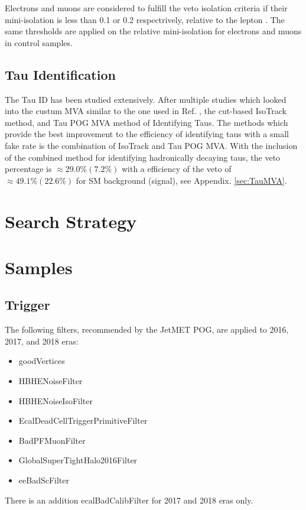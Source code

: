  Electrons and muons are considered to fulfill the veto isolation criteria if their mini-isolation is less than 0.1 or 0.2 respectrively, relative to the lepton \pt. The same thresholds are applied on the relative mini-isolation for electrons and muons in control samples. 
 
\subsection{Tau Identification}\label{TauID}
The Tau ID has been studied extensively. After multiple studies which looked into the custum MVA \cite{roe_boosted_2004, hoecker_tmva_2007} similar to the one used in Ref. \cite{noauthor_search_nodate}, the cut-based IsoTrack method, and Tau POG MVA method of Identifying Taus. The methods which provide the best improvement to the efficiency of identifying taus with a small fake rate is the combination of IsoTrack and Tau POG MVA. With the inclusion of the combined method for identifying hadronically decaying taus, the veto percentage is $\approx29.0\%(7.2\%)$ with a efficiency of the veto of $\approx49.1\%(22.6\%)$ for SM background (signal), see Appendix. \ref{sec:TauMVA}. 

\section{Search Strategy}\label{BaselineSearch}

\section{Samples}\label{Samples}



\subsection{Trigger}
The following filters, recommended by the JetMET POG, are applied to 2016, 2017, and 2018 eras:
\begin{itemize}
	\item goodVertices
	\item HBHENoiseFilter
	\item HBHENoiseIsoFilter
	\item EcalDeadCellTriggerPrimitiveFilter
	\item BadPFMuonFilter
	\item GlobalSuperTightHalo2016Filter
	\item eeBadScFilter
\end{itemize}
There is an addition ecalBadCalibFilter for 2017 and 2018 eras only.

